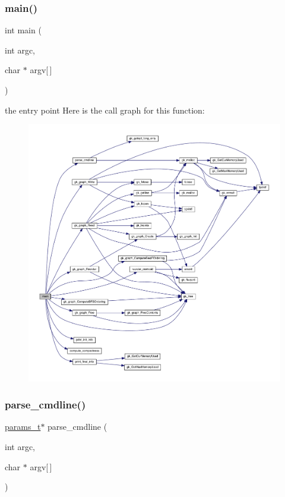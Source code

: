 \subsubsection{\texorpdfstring{main()}{main()}}
{\footnotesize\ttfamily int main (\begin{DoxyParamCaption}\item[{int}]{argc,  }\item[{char $\ast$}]{argv\mbox{[}$\,$\mbox{]} }\end{DoxyParamCaption})}

the entry point Here is the call graph for this function\+:\nopagebreak
\begin{figure}[H]
\begin{center}
\leavevmode
\includegraphics[width=350pt]{a00149_a0ddf1224851353fc92bfbff6f499fa97_cgraph}
\end{center}
\end{figure}
\mbox{\label{a00149_a0e7ce196a2f8882777957bf898739f6f}} 
\subsubsection{\texorpdfstring{parse\+\_\+cmdline()}{parse\_cmdline()}}
{\footnotesize\ttfamily \hyperlink{a00706}{params\+\_\+t}$\ast$ parse\+\_\+cmdline (\begin{DoxyParamCaption}\item[{int}]{argc,  }\item[{char $\ast$}]{argv\mbox{[}$\,$\mbox{]} }\end{DoxyParamCaption})}

